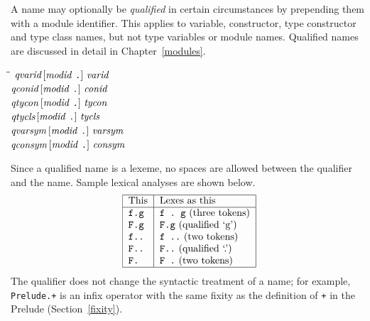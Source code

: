 A name may optionally be {\em qualified} in certain
circumstances by prepending them with a module identifier.  This
applies to variable, constructor, type constructor and type class
names, but not type variables or module names.  Qualified
names are discussed in detail in Chapter~\ref{modules}.
\begin{flushleft}\it\begin{tabbing}
\hspace{0.6in}\=\hspace{3.1in}\=\kill
$\it qvarid$\>\makebox[3.5em]{$\rightarrow$}$\it [modid\ \makebox{\tt .}]\ varid$\\ 
$\it qconid$\>\makebox[3.5em]{$\rightarrow$}$\it [modid\ \makebox{\tt .}]\ conid$\\ 
$\it qtycon$\>\makebox[3.5em]{$\rightarrow$}$\it [modid\ \makebox{\tt .}]\ tycon$\\ 
$\it qtycls$\>\makebox[3.5em]{$\rightarrow$}$\it [modid\ \makebox{\tt .}]\ tycls$\\ 
$\it qvarsym$\>\makebox[3.5em]{$\rightarrow$}$\it [modid\ \makebox{\tt .}]\ varsym$\\ 
$\it qconsym$\>\makebox[3.5em]{$\rightarrow$}$\it [modid\ \makebox{\tt .}]\ consym$
\end{tabbing}\end{flushleft}
%
%
%
%
%
%
Since a qualified name is a lexeme, no spaces are
allowed between the qualifier and the name.
Sample lexical analyses are shown below.
\[\bto{|l|l|}
\hline
This                                & Lexes as this                       \\
\hline
\mbox{\tt f.g}                               & \mbox{\tt f\ .\ g} (three tokens)             \\
\mbox{\tt F.g}                               & \mbox{\tt F.g} (qualified `g')            \\
\mbox{\tt f..}                               & \mbox{\tt f\ ..} (two tokens)    \\
\mbox{\tt F..}                               & \mbox{\tt F..} (qualified `.')         \\
\mbox{\tt F.}                                & \mbox{\tt F\ .} (two tokens)                     \\
\hline\eto\]
The qualifier does not change the syntactic treatment of a name;
for example, \mbox{\tt Prelude.+} is an infix operator with the same fixity as the 
definition of \mbox{\tt +} in the Prelude (Section~\ref{fixity}).


